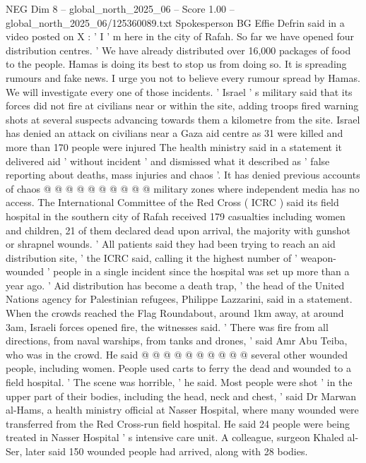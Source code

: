 \begin{textsample}{NEG Dim 8 – global\_north\_2025\_06 – Score 1.00 – global\_north\_2025\_06/125360089.txt}  \label{ex:f8_neg_403}
Spokesperson BG Effie Defrin said in a video posted on X : ' I ' m here in the city of Rafah.
So far we have opened four distribution centres. ' We have already distributed over 16,000 packages of food to the people.
Hamas is doing its best to stop us from doing so.
It is spreading rumours and fake news.
I urge you not to believe every rumour spread by Hamas.
We will investigate every one of those incidents. ' Israel ' s military said that its forces did not fire at civilians near or within the site, adding troops fired warning shots at several suspects advancing towards them a kilometre from the site.
Israel has denied an attack on civilians near a Gaza aid centre as 31 were killed and more than 170 people were injured The health ministry said in a statement it delivered aid ' without incident ' and dismissed what it described as ' false reporting about deaths, mass injuries and chaos '.
It has denied previous accounts of chaos @ @ @ @ @ @ @ @ @ @ military zones where independent media has no access.
The International Committee of the Red Cross ( ICRC ) said its field hospital in the southern city of Rafah received 179 casualties including women and children, 21 of them declared dead upon arrival, the majority with gunshot or shrapnel wounds. ' All patients said they had been trying to reach an aid distribution site, ' the ICRC said, calling it the highest number of ' weapon-wounded ' people in a single incident since the hospital was set up more than a year ago. ' Aid distribution has become a death trap, ' the head of the United Nations agency for Palestinian refugees, Philippe Lazzarini, said in a statement.
When the crowds reached the Flag Roundabout, around 1km away, at around 3am, Israeli forces opened fire, the witnesses said. ' There was fire from all directions, from naval warships, from tanks and drones, ' said Amr Abu Teiba, who was in the crowd.
He said @ @ @ @ @ @ @ @ @ @ several other wounded people, including women.
People used carts to ferry the dead and wounded to a field hospital. ' The scene was horrible, ' he said.
Most people were shot ' in the upper part of their bodies, including the head, neck and chest, ' said Dr Marwan al-Hams, a health ministry official at Nasser Hospital, where many wounded were transferred from the Red Cross-run field hospital.
He said 24 people were being treated in Nasser Hospital ' s intensive care unit.
A colleague, surgeon Khaled al-Ser, later said 150 wounded people had arrived, along with 28 bodies.

\end{textsample}
